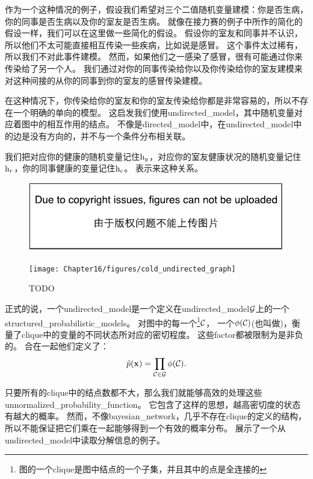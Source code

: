 作为一个这种情况的例子，假设我们希望对三个二值随机变量建模：你是否生病，你的同事是否生病以及你的室友是否生病。
就像在接力赛的例子中所作的简化的假设一样，我们可以在这里做一些简化的假设。
假设你的室友和同事并不认识，所以他们不太可能直接相互传染一些疾病，比如说是感冒。
这个事件太过稀有，所以我们不对此事件建模。
然而，如果他们之一感染了感冒，很有可能通过你来传染给了另一个人。
我们通过对你的同事传染给你以及你传染给你的室友建模来对这种间接的从你的同事到你的室友的感冒传染建模。


在这种情况下，你传染给你的室友和你的室友传染给你都是非常容易的，所以不存在一个明确的单向的模型。
这启发我们使用\gls{undirected_model}，其中随机变量对应着图中的相互作用的结点。
不像是\gls{directed_model}中，在\gls{undirected_model}中的边是没有方向的，并不与一个条件分布相关联。


我们把对应你的健康的随机变量记住$\mathrm{h}_y$，对应你的室友健康状况的随机变量记住$\mathrm{h}_r$，你的同事健康的变量记住$\mathrm{h}_c$。
表示来这种关系。

\begin{figure}[!htb]
\ifOpenSource
\centerline{\includegraphics{figure.pdf}}
\else
	\centerline{\texttt{[image: Chapter16/figures/cold\_undirected\_graph]}}	
\fi
	\caption{TODO}
	\label{fig:cold_undirected_graph}
\end{figure}

正式的说，一个\gls{undirected_model}是一个定义在\gls{undirected_model}$\mathcal{G}$上的一个\gls{structured_probabilistic_models}。
对图中的每一个\footnote{图的一个\gls{clique}是图中结点的一个子集，并且其中的点是全连接的}$\mathcal{C}$，
一个$\phi(\mathcal{C})$(也叫做)，衡量了\gls{clique}中的变量的不同状态所对应的密切程度。
这些\gls{factor}都被限制为是非负的。
合在一起他们定义了：
\begin{align}
\label{eqn:163}
\tilde{p}(\mathbf{x}) = \prod_{\mathcal{C}\in\mathcal{G}} \phi(\mathcal{C}).
\end{align}


只要所有的\gls{clique}中的结点数都不大，那么我们就能够高效的处理这些\gls{unnormalized_probability_function}。
它包含了这样的思想，越高密切度的状态有越大的概率。
然而，不像\gls{bayesian_network}，几乎不存在\gls{clique}的定义的结构，所以不能保证把它们乘在一起能够得到一个有效的概率分布。
展示了一个从\gls{undirected_model}中读取分解信息的例子。

